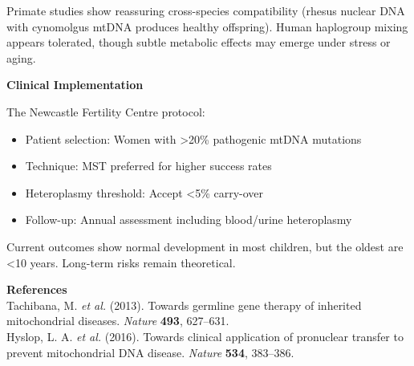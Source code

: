 \begin{technical}
Primate studies show reassuring cross-species compatibility (rhesus nuclear DNA with cynomolgus mtDNA produces healthy offspring). Human haplogroup mixing appears tolerated, though subtle metabolic effects may emerge under stress or aging.

\noindent\textbf{Clinical Implementation}

The Newcastle Fertility Centre protocol:
\begin{itemize}[leftmargin=*]
\item Patient selection: Women with >20\% pathogenic mtDNA mutations
\item Technique: MST preferred for higher success rates
\item Heteroplasmy threshold: Accept <5\% carry-over
\item Follow-up: Annual assessment including blood/urine heteroplasmy
\end{itemize}

Current outcomes show normal development in most children, but the oldest are <10 years. Long-term risks remain theoretical.

\vspace{0.5em}
\noindent\textbf{References}\\
Tachibana, M. \textit{et al.} (2013). Towards germline gene therapy of inherited mitochondrial diseases. \textit{Nature} \textbf{493}, 627–631.\\
Hyslop, L. A. \textit{et al.} (2016). Towards clinical application of pronuclear transfer to prevent mitochondrial DNA disease. \textit{Nature} \textbf{534}, 383–386.
\end{technical}
